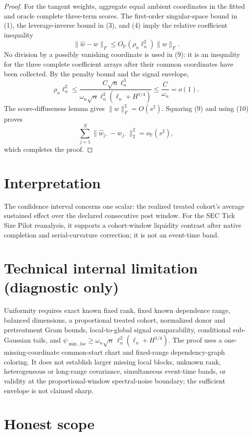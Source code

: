 \documentclass{article}
\begin{document}
\begin{proof}
For the tangent weights, aggregate equal ambient coordinates in the fitted and oracle complete three-term scores.  The first-order singular-space bound in (1), the leverage-inverse bound in (3), and (4) imply the relative coefficient inequality
\[
 \|\widehat w-w\|_F
 \le O_{\mathbb P}(\rho_n\ell_n^2)\|w\|_F.
 \tag{9}
\]
No division by a possibly vanishing coordinate is used in (9): it is an inequality for the three complete coefficient arrays after their common coordinates have been collected.  By the penalty bound and the signal envelope,
\[
 \rho_n\ell_n^2
 \le
 \frac{C\sqrt n\ell_n^3}
 {\omega_n\sqrt n\ell_n^2(\ell_n+H^{1/4})}
 \le\frac{C}{\omega_n}=o(1).
 \tag{10}
\]
The score-diffuseness lemma gives \(\|w\|_F^2=O(s^2)\).  Squaring (9) and using (10) proves
\[
 \sum_{j=1}^N\|\widehat w_{j\cdot}-w_{j\cdot}\|_2^2
 =o_{\mathbb P}(s^2),
\]
which completes the proof.
\end{proof}

\section{Interpretation}

The confidence interval concerns one scalar: the realized treated cohort's average sustained effect over the declared consecutive post window. For the SEC Tick Size Pilot reanalysis, it supports a cohort-window liquidity contrast after native completion and serial-curvature correction; it is not an event-time band.

\section*{Technical internal limitation (diagnostic only)}

Uniformity requires exact known fixed rank, fixed known dependence range, balanced dimensions, a proportional treated cohort, normalized donor and pretreatment Gram bounds, local-to-global signal comparability, conditional sub-Gaussian tails, and \(\psi_{\min,\mathrm{loc}}\ge\omega_n\sqrt n\,\ell_n^2(\ell_n+H^{1/4})\). The proof uses a one-missing-coordinate common-start chart and fixed-range dependency-graph coloring. It does not establish larger missing local blocks, unknown rank, heterogeneous or long-range covariance, simultaneous event-time bands, or validity at the proportional-window spectral-noise boundary; the sufficient envelope is not claimed sharp.

\section{Honest scope}
\end{document}
